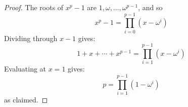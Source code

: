 \begin{proof}
    The roots of $x^p-1$ are $1,\omega,\ldots,\omega^{p-1}$, and so
    \[ x^p-1 = \prod_{i=0}^{p-1} (x-\omega^i) \]
    Dividing through $x-1$ gives:
    \[ 1+x+\cdots+x^{p-1} = \prod_{i=1}^{p-1} (x-\omega^i) \]
    Evaluating at $x=1$ gives:
    \[ p = \prod_{i=1}^{p-1} (1-\omega^i) \]
    as claimed.
\end{proof}
